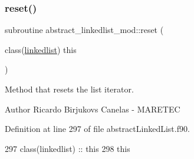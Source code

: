\subsubsection{\texorpdfstring{reset()}{reset()}}
{\footnotesize\ttfamily subroutine abstract\+\_\+linkedlist\+\_\+mod\+::reset (\begin{DoxyParamCaption}\item[{class(\mbox{\hyperlink{structabstract__linkedlist__mod_1_1linkedlist}{linkedlist}})}]{this }\end{DoxyParamCaption})\hspace{0.3cm}{\ttfamily [private]}}



Method that resets the list iterator. 

\begin{DoxyAuthor}{Author}
Ricardo Birjukovs Canelas -\/ M\+A\+R\+E\+T\+EC 
\end{DoxyAuthor}


Definition at line 297 of file abstract\+Linked\+List.\+f90.


\begin{DoxyCode}
297     \textcolor{keywordtype}{class}(linkedlist) :: this
298     this%
\end{DoxyCode}
